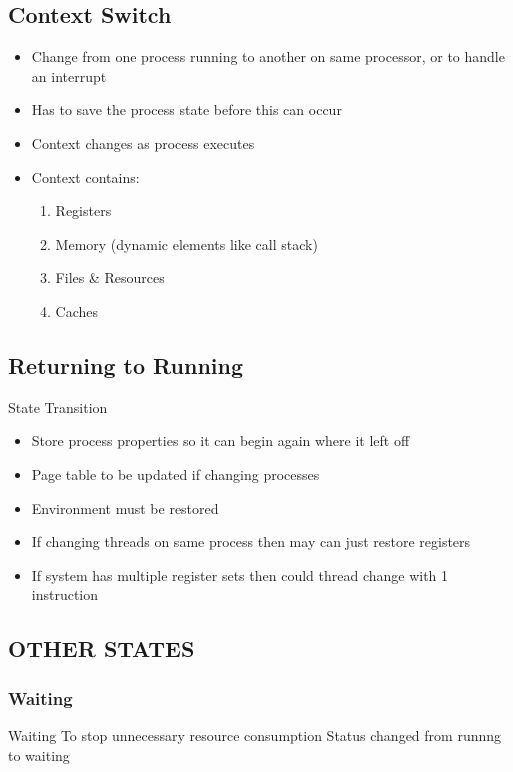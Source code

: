 \documentclass{article}
\begin{document}
	\subsection{Context Switch}
		\begin{itemize}
			\item Change from one process running to another on same processor, or to handle an interrupt
		\item Has to save the process state before this can occur
		\item Context changes as process executes
		\item Context contains:
		\begin{enumerate}
			\item Registers
			\item Memory (dynamic elements like call stack)
			\item Files \& Resources
			\item Caches
		\end{enumerate}

		\end{itemize}

	\subsection{Returning to Running}
		State Transition
		\begin{itemize}
			\item Store process properties so it can begin again where it left off
			\item Page table to be updated if changing processes
			\item Environment must be restored
			\item If changing threads on same process then may can just restore registers
			\item If system has multiple register sets then could thread change with 1 instruction
		\end{itemize}

	\subsection{OTHER STATES}
		\subsubsection{Waiting}

	Waiting
		To stop unnecessary resource consumption
		Status changed from runnng to waiting
\end{document}
